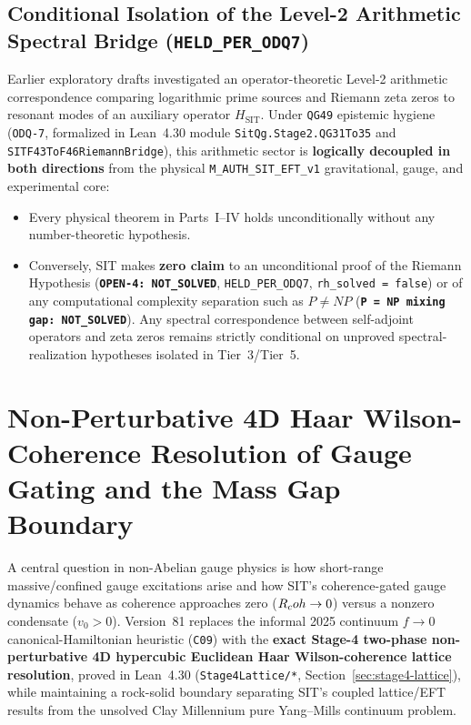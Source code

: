 \subsection{Conditional Isolation of the Level-2 Arithmetic Spectral Bridge (\texttt{HELD\_PER\_ODQ7})}

Earlier exploratory drafts investigated an operator-theoretic Level-2 arithmetic correspondence comparing logarithmic prime sources and Riemann zeta zeros to resonant modes of an auxiliary operator $H_{\mathrm{SIT}}$. Under \texttt{QG49} epistemic hygiene (\texttt{ODQ-7}, formalized in Lean~4.30 module \texttt{SitQg.Stage2.QG31To35} and \texttt{SITF43\allowbreak{}To\allowbreak{}F46\allowbreak{}Riemann\allowbreak{}Bridge}), this arithmetic sector is \textbf{logically decoupled in both directions} from the physical \texttt{M\_AUTH\_SIT\_EFT\_v1} gravitational, gauge, and experimental core:
\begin{itemize}
  \item Every physical theorem in Parts~I--IV holds unconditionally without any number-theoretic hypothesis.
  \item Conversely, SIT makes \textbf{zero claim} to an unconditional proof of the Riemann Hypothesis (\textbf{\texttt{OPEN-4: NOT\_SOLVED}}, \texttt{HELD\_PER\_ODQ7}, \texttt{rh\_solved = false}) or of any computational complexity separation such as $P \ne NP$ (\textbf{\texttt{P = NP mixing gap: NOT\_\allowbreak{}SOLVED}}). Any spectral correspondence between self-adjoint operators and zeta zeros remains strictly conditional on unproved spectral-realization hypotheses isolated in Tier~3/Tier~5.
\end{itemize}


\section{Non-Perturbative 4D Haar Wilson-Coherence Resolution of Gauge Gating and the Mass Gap Boundary}
\label{sec:mass-gap}

A central question in non-Abelian gauge physics is how short-range massive/confined gauge excitations arise and how SIT's coherence-gated gauge dynamics behave as coherence approaches zero ($R_coh \to 0$) versus a nonzero condensate ($v_0 > 0$). Version~81 replaces the informal 2025 continuum $f \to 0$ canonical-Hamiltonian heuristic (\texttt{C09}) with the \textbf{exact Stage-4 two-phase non-perturbative 4D hypercubic Euclidean Haar Wilson-coherence lattice resolution}, proved in Lean~4.30 (\texttt{Stage4Lattice/*}, Section~\ref{sec:stage4-lattice}), while maintaining a rock-solid boundary separating SIT's coupled lattice/EFT results from the unsolved Clay Millennium pure Yang--Mills continuum problem.

